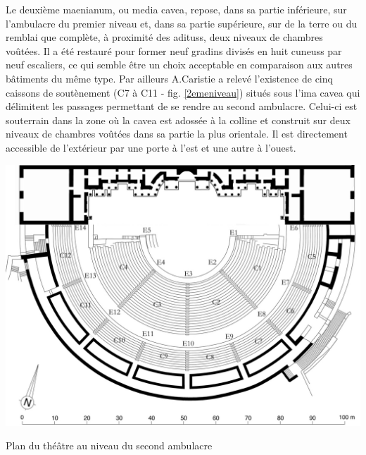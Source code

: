 		
		Le deuxième \gls{maenianum}, ou \gls{media cavea}, repose, dans sa partie inférieure, sur l'\gls{ambulacre} du premier niveau et, dans sa partie supérieure, sur de la terre ou du remblai que complète, à proximité des \glspl{aditus}, deux niveaux de chambres voûtées. Il a été restauré pour former neuf gradins divisés en huit \glspl{cuneus} par neuf escaliers, ce qui semble être un choix acceptable en comparaison aux autres bâtiments du même type. Par ailleurs A.Caristie a relevé l'existence de cinq caissons de soutènement (C7 à C11 - fig. \ref{2emeniveau}) situés sous l'\gls{ima cavea} qui délimitent les passages permettant de se rendre au second \gls{ambulacre}. Celui-ci est souterrain dans la zone où la \gls{cavea} est adossée à la colline et construit sur deux niveaux de chambres voûtées dans sa partie la plus orientale. Il est directement accessible de l'extérieur par une porte à l'est et une autre à l'ouest.
		
	\begin{figureth}
		\includegraphics[width=\linewidth]{images/2emeniveau}
		\caption[Vue de dessus - 2ème niveau]{Plan du théâtre au niveau du second \gls{ambulacre} \footnotemark }
		\label{2emeniveau}
	\end{figureth}		
		
